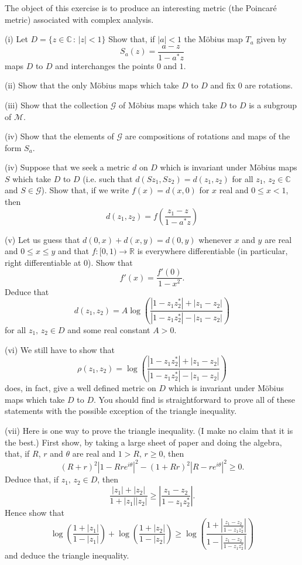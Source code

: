 \begin{problem}\label{E;hyperbolic}
The object of this exercise is to produce an interesting metric
(the Poincar\'{e} metric) associated with complex analysis.

(i) Let $D=\{z\in{\mathbb C}\,:\,|z|<1\}$ Show that, if $|a|<1$
the M\"{o}bius map $T_{a}$ given by
\[S_{a}(z)=\frac{a-z}{1-a^{*}z}\]
maps $D$ to $D$ and interchanges the points $0$ and $1$.

(ii) Show that the only M\"{o}bius maps which take $D$ to $D$
and fix $0$ are rotations.

(iii) Show that the collection ${\mathcal G}$ of
M\"{o}bius maps which take $D$ to $D$ is a subgroup of ${\mathcal M}$.

(iv) Show that the elements of ${\mathcal G}$
are compositions of rotations and maps of the form $S_{a}$.

(iv) Suppose that we seek a metric $d$ on $D$ which is invariant
under M\"{o}bius maps $S$ which take $D$ to $D$
(i.e. such that $d(Sz_{1},Sz_{2})=d(z_{1},z_{2})$
for all $z_{1},\,z_{2}\in {\mathbb C}$
and $S\in {\mathcal G}$). Show that, if we write
$f(x)=d(x,0)$ for $x$ real and $0\leq x<1$, then
\[d(z_{1},z_{2})=f\left(\frac{z_{1}-z}{1-a^{*}z}\right)\]

(v) Let us guess that $d(0,x)+d(x,y)=d(0,y)$ whenever $x$ and $y$
are real and $0\leq x\leq y$ and that $f:[0,1)\rightarrow{\mathbb R}$
is everywhere differentiable (in particular, right differentiable at $0$).
Show that
\[f'(x)=\frac{f'(0)}{1-x^{2}}.\]
Deduce that
\[d(z_{1},z_{2})=A\log\left(
\frac{|1-z_{1}z_{2}^{*}|+|z_{1}-z_{2}|}{|1-z_{1}z_{2}^{*}|-|z_{1}-z_{2}|}
\right)\]
for all $z_{1},\,z_{2}\in D$ and some real constant $A>0$.

(vi) We still have to show that
\[
\rho(z_{1},z_{2})=\log\left(
\frac{|1-z_{1}z_{2}^{*}|+|z_{1}-z_{2}|}{|1-z_{1}z_{2}^{*}|-|z_{1}-z_{2}|}
\right)\]
does, in fact, give a well defined metric on $D$ which is invariant under
M\"{o}bius maps which take $D$ to $D$.
You should find is straightforward to prove all of these
statements with the possible exception of the triangle inequality.

(vii) Here is one way to prove the triangle inequality.
(I make no claim that it is the best.) First show, by
taking a large sheet of paper and doing the algebra, that,
if $R$, $r$ and $\theta$ are real and $1>R,\,r\geq 0$,
then
\[(R+r)^{2}|1-Rre^{i\theta}|^{2}-
(1+Rr)^{2}|R-re^{i\theta}|^{2}\geq 0.\]
Deduce that, if $z_{1},\,z_{2}\in D$, then
\[\frac{|z_{1}|+|z_{2}|}{1+|z_{1}||z_{2}|}
\geq \left|\frac{z_{1}-z_{2}}{1-z_{1}z_{2}^{*}}\right|.\]
Hence show that
\[\log\left(\frac{1+|z_{1}|}{1-|z_{1}|}\right)
+\log\left(\frac{1+|z_{2}|}{1-|z_{2}|}\right)
\geq\log\left(\frac{1+
\left|\frac{z_{1}-z_{2}}{1-z_{1}z_{2}^{*}}\right|}
{1-\left|\frac{z_{1}-z_{2}}{1-z_{1}z_{2}^{*}}\right|}\right)\]
and deduce the triangle inequality.


\end{problem}
